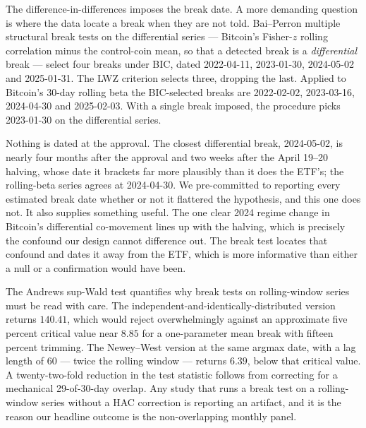 \documentclass[12pt,a4paper]{article}
\begin{document}
The difference-in-differences imposes the break date. A more demanding question is where the data locate a break when they are not told. Bai--Perron multiple structural break tests on the differential series — Bitcoin's Fisher-$z$ rolling correlation minus the control-coin mean, so that a detected break is a \emph{differential} break — select four breaks under BIC, dated
2022-04-11, 2023-01-30, 2024-05-02 and 2025-01-31. The LWZ criterion selects three, dropping the last. Applied to Bitcoin's 30-day rolling beta the BIC-selected breaks are
2022-02-02, 2023-03-16, 2024-04-30 and 2025-02-03. With a single break imposed, the procedure picks
2023-01-30 on the differential series.

Nothing is dated at the approval. The closest differential break, 2024-05-02, is nearly four months after the approval and two weeks after the April 19--20 halving, whose date it brackets far more plausibly than it does the ETF's; the rolling-beta series agrees at 2024-04-30. We pre-committed to reporting every estimated break date whether or not it flattered the hypothesis, and this one does not. It also supplies something useful. The one clear 2024 regime change in Bitcoin's differential co-movement lines up with the halving, which is precisely the confound our design cannot difference out. The break test locates that confound and dates it away from the ETF, which is more informative than either a null or a confirmation would have been.

The Andrews sup-Wald test quantifies why break tests on rolling-window series must be read with care. The independent-and-identically-distributed version returns
$140.41$, which would reject overwhelmingly against an approximate five percent critical value near $8.85$ for a one-parameter mean break with fifteen percent trimming. The Newey--West version at the same argmax date, with a lag length of
60 — twice the rolling window — returns
$6.39$, below that critical value. A twenty-two-fold reduction in the test statistic follows from correcting for a mechanical 29-of-30-day overlap.
Any study that runs a break test on a rolling-window series without a HAC correction is reporting an artifact, and it is the reason our headline outcome is the non-overlapping monthly panel.
\end{document}
